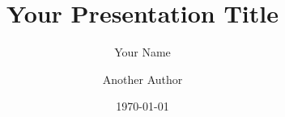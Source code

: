 \documentclass[aspectratio=169,hyperref={pdfpagelabels=false}]{beamer}
\title{Your Presentation Title}
\author{Your Name \and Another Author}
\institute{Your Institution}
\date{\today}
\begin{document}
\inserttitlepage




\end{document}
